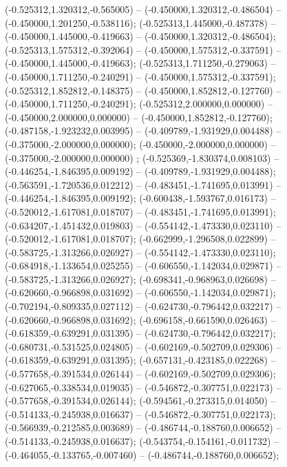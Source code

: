  (-0.525312,1.320312,-0.565005) -- (-0.450000,1.320312,-0.486504) -- (-0.450000,1.201250,-0.538116);
 (-0.525313,1.445000,-0.487378) -- (-0.450000,1.445000,-0.419663) -- (-0.450000,1.320312,-0.486504);
 (-0.525313,1.575312,-0.392064) -- (-0.450000,1.575312,-0.337591) -- (-0.450000,1.445000,-0.419663);
 (-0.525313,1.711250,-0.279063) -- (-0.450000,1.711250,-0.240291) -- (-0.450000,1.575312,-0.337591);
 (-0.525312,1.852812,-0.148375) -- (-0.450000,1.852812,-0.127760) -- (-0.450000,1.711250,-0.240291);
 (-0.525312,2.000000,0.000000) -- (-0.450000,2.000000,0.000000) -- (-0.450000,1.852812,-0.127760);
 (-0.487158,-1.923232,0.003995) -- (-0.409789,-1.931929,0.004488) -- (-0.375000,-2.000000,0.000000);
 (-0.450000,-2.000000,0.000000) -- (-0.375000,-2.000000,0.000000) ;
 (-0.525369,-1.830374,0.008103) -- (-0.446254,-1.846395,0.009192) -- (-0.409789,-1.931929,0.004488);
 (-0.563591,-1.720536,0.012212) -- (-0.483451,-1.741695,0.013991) -- (-0.446254,-1.846395,0.009192);
 (-0.600438,-1.593767,0.016173) -- (-0.520012,-1.617081,0.018707) -- (-0.483451,-1.741695,0.013991);
 (-0.634207,-1.451432,0.019803) -- (-0.554142,-1.473330,0.023110) -- (-0.520012,-1.617081,0.018707);
 (-0.662999,-1.296508,0.022899) -- (-0.583725,-1.313266,0.026927) -- (-0.554142,-1.473330,0.023110);
 (-0.684918,-1.133654,0.025255) -- (-0.606550,-1.142034,0.029871) -- (-0.583725,-1.313266,0.026927);
 (-0.698341,-0.968963,0.026698) -- (-0.620660,-0.966898,0.031692) -- (-0.606550,-1.142034,0.029871);
 (-0.702194,-0.809335,0.027112) -- (-0.624730,-0.796442,0.032217) -- (-0.620660,-0.966898,0.031692);
 (-0.696158,-0.661590,0.026463) -- (-0.618359,-0.639291,0.031395) -- (-0.624730,-0.796442,0.032217);
 (-0.680731,-0.531525,0.024805) -- (-0.602169,-0.502709,0.029306) -- (-0.618359,-0.639291,0.031395);
 (-0.657131,-0.423185,0.022268) -- (-0.577658,-0.391534,0.026144) -- (-0.602169,-0.502709,0.029306);
 (-0.627065,-0.338534,0.019035) -- (-0.546872,-0.307751,0.022173) -- (-0.577658,-0.391534,0.026144);
 (-0.594561,-0.273315,0.014050) -- (-0.514133,-0.245938,0.016637) -- (-0.546872,-0.307751,0.022173);
 (-0.566939,-0.212585,0.003689) -- (-0.486744,-0.188760,0.006652) -- (-0.514133,-0.245938,0.016637);
 (-0.543754,-0.154161,-0.011732) -- (-0.464055,-0.133765,-0.007460) -- (-0.486744,-0.188760,0.006652);
